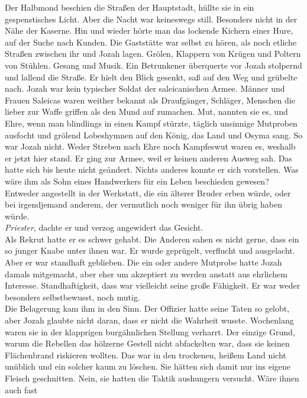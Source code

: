Der Halbmond beschien die Straßen der Hauptstadt, hüllte sie in ein gespenstisches Licht. Aber die 
Nacht war keineswegs still. Besonders nicht in der Nähe der Kaserne. Hin und wieder hörte man das 
lockende Kichern einer Hure, auf der Suche nach Kunden. Die Gaststätte war selbst zu hören, als 
noch etliche Straßen zwischen ihr und Jozah lagen. Grölen, Klappern von Krügen und Poltern von 
Stühlen. Gesang und Musik. Ein Betrunkener überquerte vor Jozah stolpernd und lallend die Straße. 
Er hielt den Blick gesenkt, saß auf den Weg und grübelte nach. Jozah war kein typischer Soldat der 
saleicanischen Armee. Männer und Frauen Saleicas waren weither bekannt als Draufgänger, Schläger, 
Menschen die lieber zur Waffe griffen als den Mund auf zumachen. Mut, nannten sie es, und Ehre, 
wenn man blindlings in einen Kampf stürzte, täglich unsinnige Mutproben ausfocht und grölend 
Lobeshymnen auf den König, das Land und Osyma sang. So war Jozah nicht. Weder Streben nach Ehre 
noch Kampfeswut waren es, weshalb er jetzt hier stand. Er ging zur Armee, weil er keinen anderen 
Ausweg sah. Das hatte sich bis heute nicht geändert. Nichts anderes konnte er sich vorstellen. Was 
wäre ihm als Sohn eines Handwerkers für ein Leben beschieden gewesen? Entweder angestellt in der 
Werkstatt, die ein älterer Bruder erben würde, oder bei irgendjemand anderem, der vermutlich noch 
weniger für ihn übrig haben würde. \\
\textit{Priester}, dachte er und verzog angewidert das Gesicht. \\
Als Rekrut hatte er es schwer gehabt. Die Anderen sahen es nicht gerne, dass ein so junger Knabe 
unter ihnen war. Er wurde geprügelt, verflucht und ausgelacht. Aber er war standhaft geblieben. Die 
ein oder andere Mutprobe hatte Jozah damals mitgemacht, aber eher um akzeptiert zu werden anstatt 
aus ehrlichem Interesse. Standhaftigkeit, dass war vielleicht seine große Fähigkeit. Er war weder 
besonders selbstbewusst, noch mutig. \\
Die Belagerung kam ihm in den Sinn. Der Offizier hatte seine Taten so gelobt, aber Jozah glaubte 
nicht daran, dass er nicht die Wahrheit wusste. Wochenlang waren sie in der klapprigen 
burgähnlichen Stellung verharrt. Der einzige Grund, warum die Rebellen das hölzerne Gestell nicht 
abfackelten war, dass sie keinen Flächenbrand riskieren wollten. Das war in den trockenen, 
heißem Land nicht unüblich und ein solcher kaum zu löschen. Sie hätten sich damit nur ins eigene 
Fleisch geschnitten. Nein, sie hatten die Taktik aushungern versucht. Wäre ihnen auch fast 
